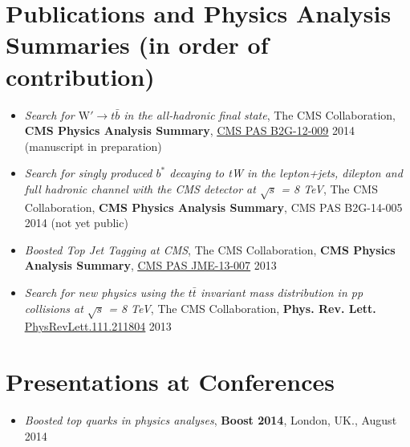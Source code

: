 \documentclass[12pt,oneside,final]{thesis}
\begin{document}
\begin{vita}
\section*{Publications and Physics Analysis Summaries (in order of contribution)}
\begin{itemize}
\item \textit{Search for $\mathrm{W'} \to t\bar{b}$ in the all-hadronic final state}, The CMS Collaboration, 
\textbf{CMS Physics Analysis Summary}, \href{http://cms-physics.web.cern.ch/cms-physics/public/B2G-12-009-pas.pdf}{{\color{blue} \underline{CMS PAS B2G-12-009}}} 2014 (manuscript in preparation)
\item \textit{Search for singly produced $b^*$ decaying to tW in the lepton+jets, dilepton and full hadronic channel with the CMS detector at $\sqrt{s}$ = 8 TeV}, The CMS Collaboration, 
\textbf{CMS Physics Analysis Summary}, CMS PAS B2G-14-005 2014 (not yet public)
\item \textit{Boosted Top Jet Tagging at CMS}, The CMS Collaboration,
\textbf{CMS Physics Analysis Summary}, \href{http://cms-physics.web.cern.ch/cms-physics/public/JME-13-007-pas.pdf}{{\color{blue}\underline{CMS PAS JME-13-007}}} 2013
\item \textit{Search for new physics using the $t\bar{t}$ invariant mass distribution in pp collisions at $\sqrt{s}$ = 8 TeV}, The CMS Collaboration, \textbf{Phys. Rev. Lett.}
\href{http://journals.aps.org/prl/pdf/10.1103/PhysRevLett.111.211804}{{\color{blue}\underline{PhysRevLett.111.211804}}} 2013
\end{itemize}

\section*{Presentations at Conferences}
\begin{itemize}
  \item \textit{Boosted top quarks in physics analyses}, \textbf{Boost 2014}, London, UK., August 2014
\end{itemize}
\end{vita}
\end{document}
